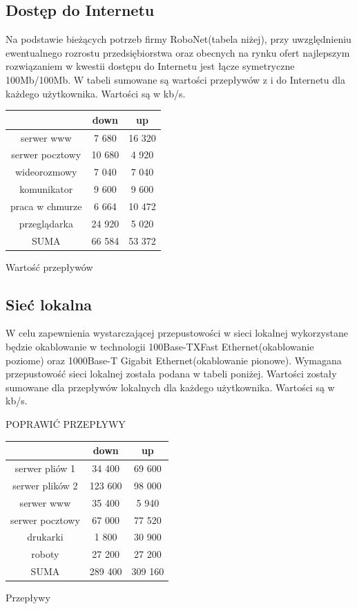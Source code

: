 \documentclass{article}
\begin{document}
\subsection{Dostęp do Internetu}
Na podstawie bieżących potrzeb firmy RoboNet(tabela niżej), przy uwzględnieniu ewentualnego rozrostu przedsiębiorstwa oraz obecnych na rynku ofert najlepszym rozwiązaniem w kwestii dostępu do Internetu jest łącze symetryczne 100Mb/100Mb.\newline
W tabeli sumowane są wartości przepływów z i do Internetu dla każdego użytkownika. Wartości są w kb/s.
\newline
\begin{Tabela}[!ht]
	\centering
\begin{tabular}{|c|c|c|} \hline
	& down & up \\
	\hline
	serwer www & 7 680 & 16 320\\
	serwer pocztowy & 10 680 & 4 920\\
	wideorozmowy & 7 040 & 7 040 \\
	komunikator & 9 600 & 9 600 \\
	praca w chmurze & 6 664 & 10 472 \\
	przeglądarka & 24 920 & 5 020 \\
	\hline
	\hline
	SUMA & 66 584 & 53 372\\
	\hline
\end{tabular}
\caption{Wartość przepływów}
\end{Tabela}

\subsection{Sieć lokalna}
W celu zapewnienia wystarczającej przepustowości w sieci lokalnej wykorzystane będzie okablowanie w technologii 100Base-TXFast Ethernet(okablowanie poziome) oraz 1000Base-T Gigabit Ethernet(okablowanie pionowe).  Wymagana przepustowość sieci lokalnej została podana w tabeli poniżej. Wartości zostały sumowane dla przepływów lokalnych dla każdego użytkownika. Wartości są w kb/s.

POPRAWIĆ PRZEPŁYWY

\begin{Tabela}[!ht]
	\centering
\begin{tabular}{|c|c|c|} \hline
	& down & up \\
	\hline
	serwer pliów 1 & 34 400 & 69 600\\
	serwer plików 2 & 123 600 & 98 000\\
	serwer www & 35 400 & 5 940\\
	serwer pocztowy & 67 000 & 77 520\\
	drukarki & 1 800 & 30 900\\
	roboty & 27 200 & 27 200\\
	\hline
	\hline
	SUMA & 289 400 & 309 160\\
	\hline
\end{tabular}
\caption{Przepływy}
\end{Tabela}
\newpage
\end{document}

